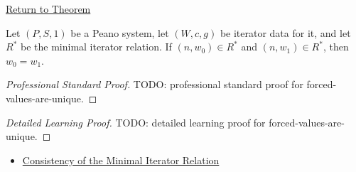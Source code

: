\newpage
{}
\label{prf:forced-values-are-unique}

\begin{remark*}[Return]
\hyperref[lem:forced-values-are-unique]{Return to Theorem}
\end{remark*}

\begin{lemma*}
Let $(P,S,1)$ be a Peano system, let $(W,c,g)$ be iterator data for it, and let
$R^*$ be the minimal iterator relation. If $(n,w_0)\in R^*$ and
$(n,w_1)\in R^*$, then $w_0=w_1$.
\end{lemma*}

\begin{proof}[Professional Standard Proof]
\LRAProofBodyStart
TODO: professional standard proof for forced-values-are-unique.
\end{proof}

\begin{proof}[Detailed Learning Proof]
\LRAProofBodyStart
TODO: detailed learning proof for forced-values-are-unique.
\end{proof}

\begin{remark*}
\end{remark*}

\begin{dependencies}
\begin{itemize}
  \item \hyperref[lem:iterator-relation-consistency]{Consistency of the Minimal Iterator Relation}
\end{itemize}
\end{dependencies}

\clearpage
